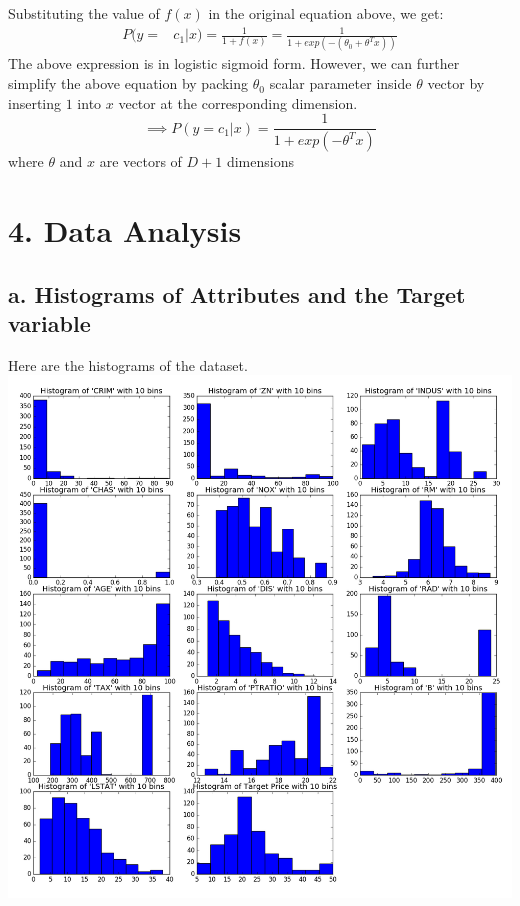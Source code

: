 \documentclass[letterpaper,doc,notimes]{apa6}
\begin{document}
{ Substituting the value of $f(x)$ in the original equation above, we get:
\begin{align*}
	P(y =& c_1|x) = \frac{1}{1 + f(x)} 
		= \frac{1}{1 + exp(-(\theta_0 + \theta^Tx))} 
 \end{align*}
 The above expression is in logistic sigmoid form.
 However, we can further simplify the above equation by packing $\theta_0$ scalar parameter inside $\theta$ vector by inserting $1$ into $x$ vector at the corresponding dimension. \\
 \begin{equation}
	\implies 	P(y = c_1|x) = \frac{1}{1 + exp(-\theta^Tx)}
 \end{equation}
 where $\theta$ and $x$ are vectors of $D+1$ dimensions
 
 
 \section{4. Data Analysis}
 
 \subsection{a. Histograms of Attributes and the Target variable}

Here are the histograms of the dataset.\\
\includegraphics[scale=0.45]{Histograms}

}
\end{document}
